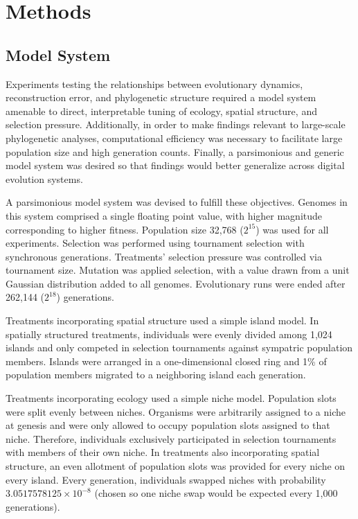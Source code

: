 \section{Methods} \label{sec:methods}

\subsection{Model System}

Experiments testing the relationships between evolutionary dynamics, reconstruction error, and phylogenetic structure required a model system amenable to direct, interpretable tuning of ecology, spatial structure, and selection pressure.
Additionally, in order to make findings relevant to large-scale phylogenetic analyses, computational efficiency was necessary to facilitate large population size and high generation counts.
Finally, a parsimonious and generic model system was desired so that findings would better generalize across digital evolution systems.   

A parsimonious model system was devised to fulfill these objectives.
Genomes in this system comprised a single floating point value, with higher magnitude corresponding to higher fitness.
Population size 32,768 ($2^{15}$) was used for all experiments.
Selection was performed using tournament selection with synchronous generations.
Treatments' selection pressure was controlled via tournament size. 
Mutation was applied selection, with a value drawn from a unit Gaussian distribution added to all genomes.
Evolutionary runs were ended after 262,144 ($2^{18}$) generations.

Treatments incorporating spatial structure used a simple island model.
In spatially structured treatments, individuals were evenly divided among 1,024 islands and only competed in selection tournaments against sympatric population members.
Islands were arranged in a one-dimensional closed ring and 1\% of population members migrated to a neighboring island each generation.

Treatments incorporating ecology used a simple niche model.
Population slots were split evenly between niches. 
Organisms were arbitrarily assigned to a niche at genesis and were only allowed to occupy population slots assigned to that niche.
Therefore, individuals exclusively participated in selection tournaments with members of their own niche.
In treatments also incorporating spatial structure, an even allotment of population slots was provided for every niche on every island.
Every generation, individuals swapped niches with probability $3.0517578125 \times 10^{-8}$ (chosen so one niche swap would be expected every 1,000 generations). 

